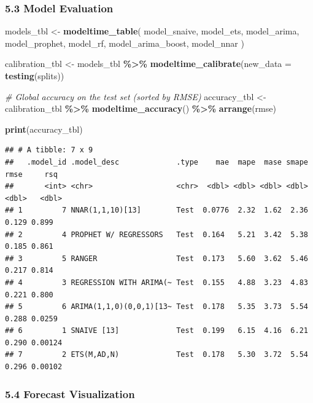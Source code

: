 \documentclass[
]{article}
\newenvironment{Shaded}{\begin{snugshade}}{\end{snugshade}}
\newcommand{\AttributeTok}[1]{\textcolor[rgb]{0.13,0.29,0.53}{#1}}
\newcommand{\CommentTok}[1]{\textcolor[rgb]{0.56,0.35,0.01}{\textit{#1}}}
\newcommand{\FunctionTok}[1]{\textcolor[rgb]{0.13,0.29,0.53}{\textbf{#1}}}
\newcommand{\NormalTok}[1]{#1}
\newcommand{\OtherTok}[1]{\textcolor[rgb]{0.56,0.35,0.01}{#1}}
\newcommand{\SpecialCharTok}[1]{\textcolor[rgb]{0.81,0.36,0.00}{\textbf{#1}}}
\begin{document}
\subsubsection{5.3 Model Evaluation}\label{model-evaluation}

\begin{Shaded}
\begin{Highlighting}[]
\NormalTok{models\_tbl }\OtherTok{\textless{}{-}} \FunctionTok{modeltime\_table}\NormalTok{(}
\NormalTok{  model\_snaive,}
\NormalTok{  model\_ets,}
\NormalTok{  model\_arima,}
\NormalTok{  model\_prophet,}
\NormalTok{  model\_rf,}
\NormalTok{  model\_arima\_boost,}
\NormalTok{  model\_nnar}
\NormalTok{)}

\NormalTok{calibration\_tbl }\OtherTok{\textless{}{-}}\NormalTok{ models\_tbl }\SpecialCharTok{\%\textgreater{}\%}
  \FunctionTok{modeltime\_calibrate}\NormalTok{(}\AttributeTok{new\_data =} \FunctionTok{testing}\NormalTok{(splits))}

\CommentTok{\# Global accuracy on the test set (sorted by RMSE)}
\NormalTok{accuracy\_tbl }\OtherTok{\textless{}{-}}\NormalTok{ calibration\_tbl }\SpecialCharTok{\%\textgreater{}\%}
  \FunctionTok{modeltime\_accuracy}\NormalTok{() }\SpecialCharTok{\%\textgreater{}\%}
  \FunctionTok{arrange}\NormalTok{(rmse)}

\FunctionTok{print}\NormalTok{(accuracy\_tbl)}
\end{Highlighting}
\end{Shaded}

\begin{verbatim}
## # A tibble: 7 x 9
##   .model_id .model_desc             .type    mae  mape  mase smape  rmse     rsq
##       <int> <chr>                   <chr>  <dbl> <dbl> <dbl> <dbl> <dbl>   <dbl>
## 1         7 NNAR(1,1,10)[13]        Test  0.0776  2.32  1.62  2.36 0.129 0.899  
## 2         4 PROPHET W/ REGRESSORS   Test  0.164   5.21  3.42  5.38 0.185 0.861  
## 3         5 RANGER                  Test  0.173   5.60  3.62  5.46 0.217 0.814  
## 4         3 REGRESSION WITH ARIMA(~ Test  0.155   4.88  3.23  4.83 0.221 0.800  
## 5         6 ARIMA(1,1,0)(0,0,1)[13~ Test  0.178   5.35  3.73  5.54 0.288 0.0259 
## 6         1 SNAIVE [13]             Test  0.199   6.15  4.16  6.21 0.290 0.00124
## 7         2 ETS(M,AD,N)             Test  0.178   5.30  3.72  5.54 0.296 0.00102
\end{verbatim}

\subsubsection{5.4 Forecast Visualization}\label{forecast-visualization}
\end{document}
